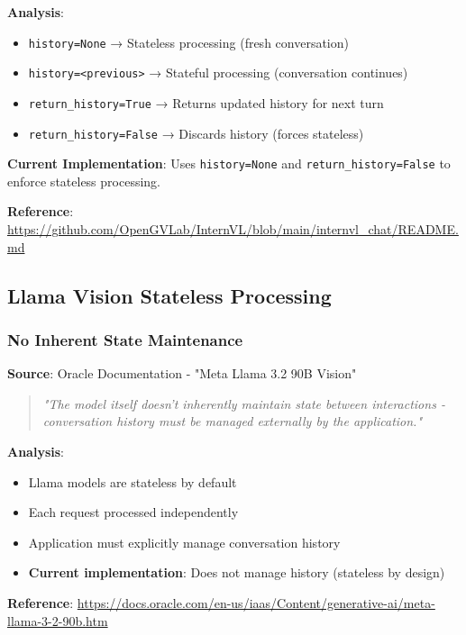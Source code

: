 \documentclass[11pt,a4paper]{article}
\begin{document}
\textbf{Analysis}:
\begin{itemize}[leftmargin=*]
    \item \texttt{history=None} → Stateless processing (fresh conversation)
    \item \texttt{history=<previous>} → Stateful processing (conversation continues)
    \item \texttt{return\_history=True} → Returns updated history for next turn
    \item \texttt{return\_history=False} → Discards history (forces stateless)
\end{itemize}

\textbf{Current Implementation}: Uses \texttt{history=None} and \texttt{return\_history=False} to enforce stateless processing.

\textbf{Reference}: \url{https://github.com/OpenGVLab/InternVL/blob/main/internvl_chat/README.md}

\subsection{Llama Vision Stateless Processing}

\subsubsection{No Inherent State Maintenance}

\textbf{Source}: Oracle Documentation - "Meta Llama 3.2 90B Vision"

\begin{quote}
\textit{"The model itself doesn't inherently maintain state between interactions - conversation history must be managed externally by the application."}
\end{quote}

\textbf{Analysis}:
\begin{itemize}[leftmargin=*]
    \item Llama models are stateless by default
    \item Each request processed independently
    \item Application must explicitly manage conversation history
    \item \textbf{Current implementation}: Does not manage history (stateless by design)
\end{itemize}

\textbf{Reference}: \url{https://docs.oracle.com/en-us/iaas/Content/generative-ai/meta-llama-3-2-90b.htm}
\end{document}
